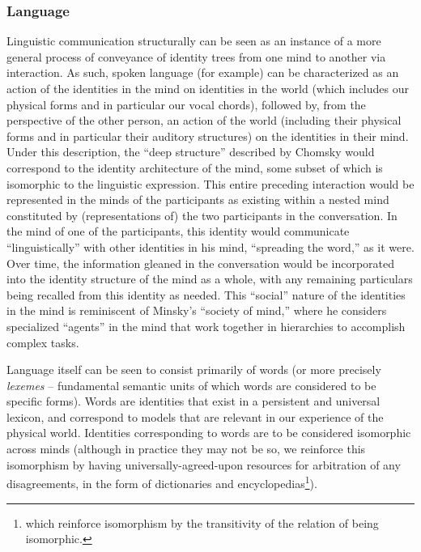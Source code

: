 \documentclass[pra,twocolumn,groupedaddress,10pt]{revtex4}
\theoremstyle{definition}
\begin{document}
\subsubsection{Language} \label{sec:language}

Linguistic communication structurally can be seen as an instance of a more general process of conveyance of identity trees from one mind to another via interaction. As such, spoken language (for example) can be characterized as an action of the identities in the mind on identities in the world (which includes our physical forms and in particular our vocal chords), followed by, from the perspective of the other person, an action of the world (including their physical forms and in particular their auditory structures) on the identities in their mind. Under this description, the ``deep structure'' described by Chomsky\cite{chomsky} would correspond to the identity architecture of the mind, some subset of which is isomorphic to the linguistic expression. This entire preceding interaction would be represented in the minds of the participants as existing within a nested mind constituted by (representations of) the two participants in the conversation. In the mind of one of the participants, this identity would communicate ``linguistically'' with other identities in his mind, ``spreading the word,'' as it were. Over time, the information gleaned in the conversation would be incorporated into the identity structure of the mind as a whole, with any remaining particulars being recalled from this identity as needed. This ``social'' nature of the identities in the mind is reminiscent of Minsky's ``society of mind,''\cite{minsky} where he considers specialized ``agents'' in the mind that work together in hierarchies to accomplish complex tasks.


Language itself can be seen to consist primarily of words (or more precisely \textit{lexemes} -- fundamental semantic units of which words are considered to be specific forms). Words are identities that exist in a persistent and universal lexicon, and correspond to models that are relevant in our experience of the physical world. Identities corresponding to words are to be considered isomorphic across minds (although in practice they may not be so, we reinforce this isomorphism by having universally-agreed-upon resources for arbitration of any disagreements, in the form of dictionaries and encyclopedias\footnote{which reinforce isomorphism by the transitivity of the relation of being isomorphic.}).
\end{document}
